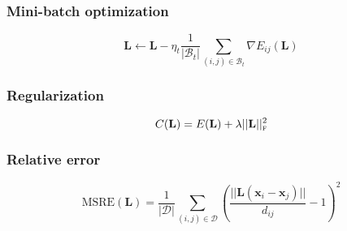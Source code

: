 \documentclass[a4paper,titlepage]{article}
\renewcommand{\vec}[1]{\mathbf{#1}}
\newcommand{\mat}[1]{\mathbf{#1}}
\begin{document}
\subsubsection{Mini-batch optimization}

\begin{equation}
\mat{L} \leftarrow \mat{L} - \eta_{t} \frac{1}{|\mathcal{B}_t|} \sum_{(i,j) \in \mathcal{B}_t} \nabla E_{ij}(\mat{L})
\label{eq:update}
\end{equation}


\subsubsection{Regularization}

\begin{equation}
C(\mat{L}) =  E(\mat{L}) + \lambda ||\mat{L}||_\textsc{f}^2
\label{eq:opt_target}
\end{equation}

\subsubsection{Relative error}

\begin{equation}
\text{MSRE}(\mat{L}) = \frac{1}{|\mathcal{D}|}\sum_{(i,j) \in \mathcal{D}} \left ( \frac{||\mat{L} (\vec{x}_i - \vec{x}_j)||}{d_{ij}} - 1 \right)^2
\label{eq:msre}
\end{equation}


\end{document}
